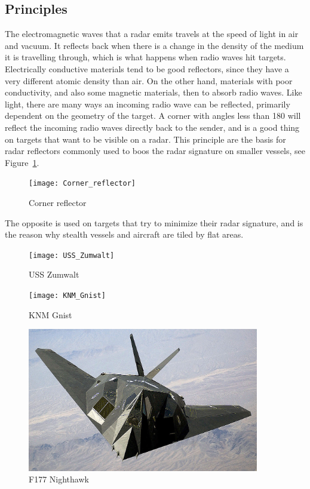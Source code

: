 \subsection{Principles}
The electromagnetic waves that a radar emits travels at the speed of light in air and vacuum. It reflects back when there is a change in the density of the medium it is travelling through, which is what happens when radio waves hit targets. Electrically conductive materials tend to be good reflectors, since they have a very different atomic density than air. On the other hand, materials with poor conductivity, and also some magnetic materials, then to absorb radio waves. Like light, there are many ways an incoming radio wave can be reflected, primarily dependent on the geometry of the target. A corner with angles less than 180\degsym{} will reflect the incoming radio waves directly back to the sender, and is a good thing on targets that want to be visible on a radar. This principle are the basis for radar reflectors commonly used to boos the radar signature on smaller vessels, see Figure~\ref{fig:corner_reflector}.
\begin{figure}
\centering
\texttt{[image: Corner\_reflector]}
\caption{Corner reflector}\label{fig:corner_reflector}
\end{figure}
The opposite is used on targets that try to minimize their radar signature, and is the reason why stealth vessels and aircraft are tiled by flat areas. 
\begin{figure}
\centering
\begin{minipage}{0.3\textwidth}
\texttt{[image: USS\_Zumwalt]}
\caption{USS Zumwalt}\label{fig:uss_zumwalt}
\end{minipage}\hfill
\begin{minipage}{0.3\textwidth}
\texttt{[image: KNM\_Gnist]}
\caption{KNM Gnist}\label{fig:knm_gnist}
\end{minipage}\hfill
\begin{minipage}{0.3\textwidth}
\includegraphics[width=0.9\textwidth]{Figures/F-117_Nighthawk}
\caption{F177 Nighthawk}\label{fig:f177_nighthawk}
\end{minipage}
\end{figure}

